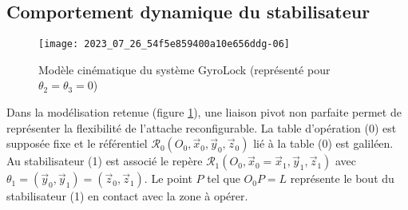 \subsection{\label{sec:II.C} Comportement dynamique du stabilisateur}

\begin{figure}[!h]
\centering
\texttt{[image: 2023\_07\_26\_54f5e859400a10e656ddg-06]}
\caption{\label{fig:09}Modèle cinématique du système GyroLock (représenté pour $\theta_{2}=\theta_{3}=0$)}
\end{figure}

Dans la modélisation retenue (figure \ref{fig:09}), une liaison pivot non parfaite permet de représenter la flexibilité de l'attache reconfigurable. La table d'opération (0) est supposée fixe et le référentiel $\mathcal{R}_{0}\left(O_{0}, \vec{x}_{0}, \vec{y}_{0}, \vec{z}_{0}\right)$ lié à la table (0) est galiléen. Au stabilisateur (1) est associé le repère $\mathcal{R}_{1}\left(O_{0}, \vec{x}_{0}=\vec{x}_{1}, \vec{y}_{1}, \vec{z}_{1}\right)$ avec $\theta_{1}=\left(\vec{y}_{0}, \vec{y}_{1}\right)=\left(\vec{z}_{0}, \vec{z}_{1}\right)$. Le point $P$ tel que $O_{0} P=L$ représente le bout du stabilisateur (1) en contact avec la zone à opérer.

